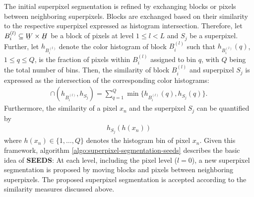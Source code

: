 The initial superpixel segmentation is refined by exchanging blocks or pixels between neighboring superpixels. Blocks are exchanged based on their similarity to the respective superpixel expressed as histogram intersection. Therefore, let $B_i^{(l)} \subseteq \ubar{W} \times \ubar{H}$ be a block of pixels at level $1 \leq l < L$ and $S_j$ be a superpixel. Further, let $h_{B_i^{(l)}}$ denote the color histogram of block $B_i^{(l)}$ such that $h_{B_i^{(l)}}(q)$, $1 \leq q \leq Q$, is the fraction of pixels within $B_i^{(l)}$ assigned to bin $q$, with $Q$ being the total number of bins. Then, the similarity of block $B_i^{(l)}$ and superpixel $S_j$ is expressed as the intersection \cite{BarlaOdoneVerri:2003} of the corresponding color histograms:
\begin{align}
	\cap(h_{B_i^{(l)}}, h_{S_j}) = \sum _{q = 1} ^Q \min \{h_{B_i^{(l)}}(q), h_{S_j}(q)\}.
\end{align}
Furthermore, the similarity of a pixel $x_n$ and the superpixel $S_j$ can be quantified by
\begin{align}
	\label{eq:superpixel-segmentation-seeds-pixel-updates}
	h_{S_j}(h(x_n))
\end{align}
where $h(x_n) \in \{1,\ldots,Q\}$ denotes the histogram bin of pixel $x_n$. Given this framework, algorithm \ref{algo:superpixel-segmentation-seeds} describes the basic idea of \textbf{SEEDS}: At each level, including the pixel level ($l = 0$), a new superpixel segmentation is proposed by moving blocks and pixels between neighboring superpixels. The proposed superpixel segmentation is accepted according to the similarity measures discussed above.
